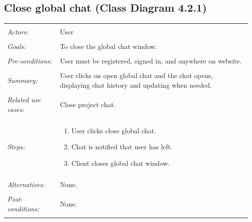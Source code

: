 \documentclass[11pt]{report}
\begin{document}
\subsection{Close global chat (Class Diagram 4.2.1)}
\begin{tabular}{ p{2cm} p{12cm} }
 \hline
 \\
 \textit{Actors:} & User \\ 
 \\
 \textit{Goals:} & To close the global chat window. \\
 \\
 \textit{Pre-conditions:} & User must be registered, signed in, and anywhere on website.  \\
 \\
 \textit{Summary:} & User clicks on open global chat and the chat opens, displaying chat history and updating when needed. \\ 
 \\
 \textit{Related use cases:} & Close project chat. \\ 
 \\
 \textit{Steps:} & \begin{enumerate}
  \item User clicks close global chat.
  \item Chat is notified that user has left.
  \item Client closes global chat window.
 \end{enumerate} \\
 \\
 \textit{Alternatives:} & None. \\
 \\
 \textit{Post-conditions:} & None. \\
 \\
\hline
\end{tabular}
\end{document}
